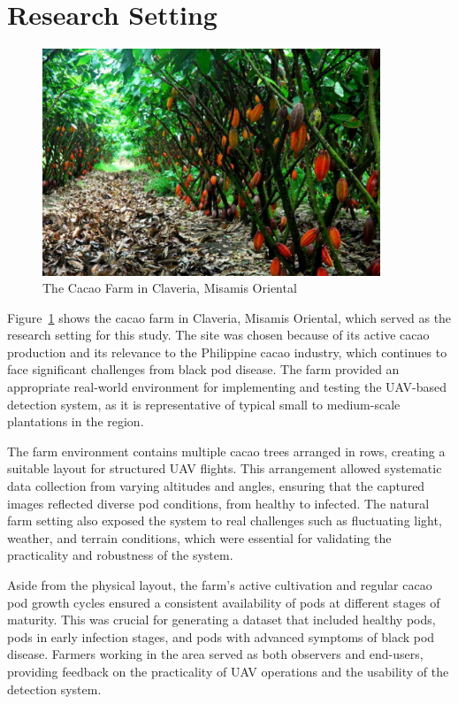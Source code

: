 \section{Research Setting}
\begin{figure}[H]
	\centering
	\caption{The Cacao Farm in Claveria, Misamis Oriental}
	\label{fig:cacao_farm}
	\includegraphics[width=0.9\textwidth]{figures/Cacao_Farm.pdf}
\end{figure}


Figure~\ref{fig:cacao_farm} shows the cacao farm in Claveria, Misamis Oriental, which served as the research setting for this study.
The site was chosen because of its active cacao production and its relevance to the Philippine cacao industry, which continues to face significant challenges from black pod disease. The farm provided an appropriate real-world environment for implementing and testing the UAV-based detection system, as it is representative of typical small to medium-scale plantations in the region.

The farm environment contains multiple cacao trees arranged in rows, creating a suitable layout for structured UAV flights.
This arrangement allowed systematic data collection from varying altitudes and angles, ensuring that the captured images reflected diverse pod conditions, from healthy to infected.
The natural farm setting also exposed the system to real challenges such as fluctuating light, weather, and terrain conditions, which were essential for validating the practicality and robustness of the system.

Aside from the physical layout, the farm’s active cultivation and regular cacao pod growth cycles ensured a consistent availability of pods at different stages of maturity.
This was crucial for generating a dataset that included healthy pods, pods in early infection stages, and pods with advanced symptoms of black pod disease.
Farmers working in the area served as both observers and end-users, providing feedback on the practicality of UAV operations and the usability of the detection system.

